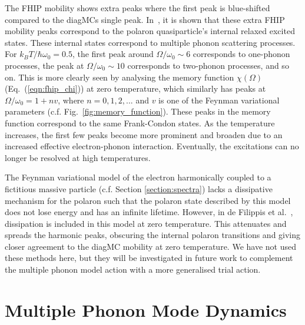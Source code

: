 The FHIP mobility shows extra peaks where the first peak is blue-shifted compared to the diagMCs single peak. In~\cite{devreese_optical_1972, de_filippis_validity_2006}, it is shown that these extra FHIP mobility peaks correspond to the polaron quasiparticle's internal relaxed excited states. These internal states correspond to multiple phonon scattering processes. For $k_B T/\hbar\omega_0 = 0.5$, the first peak around $\Omega/\omega_0 \sim 6$ corresponds to one-phonon processes, the peak at $\Omega / \omega_0 \sim 10$ corresponds to two-phonon processes, and so on. This is more clearly seen by analysing the memory function $\chi(\Omega)$ (Eq.~(\ref{eqn:fhip_chi})) at zero temperature, which similarly has peaks at $\Omega / \omega_0 = 1 + nv$, where $n = 0, 1, 2, ...$ and $v$ is one of the Feynman variational parameters (c.f. Fig.~\ref{fig:memory_function}). These peaks in the memory function correspond to the same Frank-Condon states. As the temperature increases, the first few peaks become more prominent and broaden due to an increased effective electron-phonon interaction. Eventually, the excitations can no longer be resolved at high temperatures. 

The Feynman variational model of the electron harmonically coupled to a fictitious massive particle (c.f. Section \ref{section:spectra}) lacks a dissipative mechanism for the polaron such that the polaron state described by this model does not lose energy and has an infinite lifetime. However, in de Filippis et al.~\cite{de_filippis_validity_2006}, dissipation is included in this model at zero temperature. This attenuates and spreads the harmonic peaks, obscuring the internal polaron transitions and giving closer agreement to the diagMC mobility at zero temperature. We have not used these methods here, but they will be investigated in future work to complement the multiple phonon model action with a more generalised trial action.

\section{Multiple Phonon Mode Dynamics}
\label{subsec:3-1-3}

